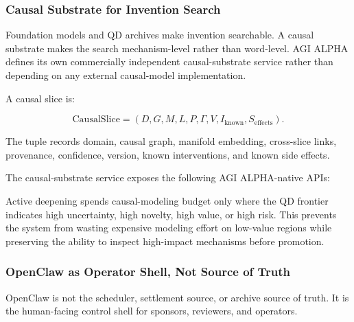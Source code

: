 \subsubsection{Causal Substrate for Invention
Search}\label{causal-substrate-for-invention-search}

Foundation models and QD archives make invention searchable. A causal
substrate makes the search mechanism-level rather than word-level. AGI
ALPHA defines its own commercially independent causal-substrate service
rather than depending on any external causal-model implementation.

A causal slice is:

\[
\mathrm{CausalSlice}=(D,G,M,L,P,\Gamma,V,I_{\mathrm{known}},S_{\mathrm{effects}}).
\]

The tuple records domain, causal graph, manifold embedding, cross-slice
links, provenance, confidence, version, known interventions, and known
side effects.

The causal-substrate service exposes the following AGI ALPHA-native
APIs:

\begin{Shaded}
\begin{Highlighting}[]
\end{Highlighting}
\end{Shaded}

Active deepening spends causal-modeling budget only where the QD
frontier indicates high uncertainty, high novelty, high value, or high
risk. This prevents the system from wasting expensive modeling effort on
low-value regions while preserving the ability to inspect high-impact
mechanisms before promotion.

\subsubsection{OpenClaw as Operator Shell, Not Source of
Truth}\label{openclaw-as-operator-shell-not-source-of-truth}

OpenClaw is not the scheduler, settlement source, or archive source of
truth. It is the human-facing control shell for sponsors, reviewers, and
operators.


